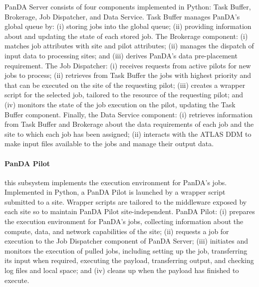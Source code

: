 
PanDA Server consists of four components implemented in Python:
Task Buffer, Brokerage, Job Dispatcher, and Data Service. Task Buffer manages
PanDA's global queue by: (i) storing jobs into the global queue; (ii) providing
information about and updating the state of each stored job. The Brokerage
component: (i) matches job attributes with site and pilot attributes; (ii)
manages the dispatch of input data to processing sites; and (iii) derives
PanDA's data pre-placement requirement. The Job Dispatcher: (i) receives
requests from active pilots for new jobs to process; (ii) retrieves from Task
Buffer the jobs with highest priority and that can be executed on the site of
the requesting pilot; (iii) creates a wrapper script for the selected job,
tailored to the resource of the requesting pilot; and (iv) monitors the state of
the job execution on the pilot, updating the Task Buffer component. Finally, the
Data Service component: (i) retrieves information from Task Buffer and Brokerage
about the data requirements of each job and the site to which each job has been
assigned; (ii) interacts with the ATLAS DDM to make input files available to the
jobs and manage their output data.


\paragraph{\textbf{PanDA Pilot}} this subsystem implements the execution
environment for PanDA's jobs\cite{nilsson2011atlas}. Implemented in Python, a
PanDA Pilot is launched by a wrapper script submitted to a site. Wrapper scripts
are tailored to the middleware exposed by each site so to maintain PanDA Pilot
site-independent. PanDA Pilot: (i) prepares the execution environment for
PanDA's jobs,
collecting information about the compute, data, and network capabilities of the
site; (ii) requests a job for execution to the Job Dispatcher component of PanDA
Server; (iii) initiates and monitors the execution of pulled jobs, including
setting up the job, transferring its input when required, executing the payload,
transferring output, and checking log files and local space; and (iv) cleans up
when the payload has finished to execute.


